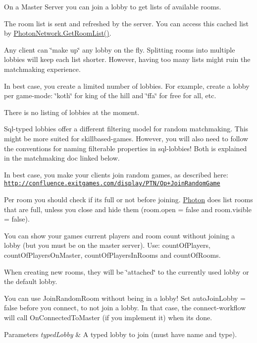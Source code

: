 On a Master Server you can join a lobby to get lists of available rooms. 

The room list is sent and refreshed by the server. You can access this cached list by \hyperlink{class_photon_network_aeef2085375accb7d4bc88e60cbe15eb9}{Photon\+Network.\+Get\+Room\+List()}.

Any client can \char`\"{}make up\char`\"{} any lobby on the fly. Splitting rooms into multiple lobbies will keep each list shorter. However, having too many lists might ruin the matchmaking experience.

In best case, you create a limited number of lobbies. For example, create a lobby per game-\/mode\+: \char`\"{}koth\char`\"{} for king of the hill and \char`\"{}ffa\char`\"{} for free for all, etc.

There is no listing of lobbies at the moment.

Sql-\/typed lobbies offer a different filtering model for random matchmaking. This might be more suited for skillbased-\/games. However, you will also need to follow the conventions for naming filterable properties in sql-\/lobbies! Both is explained in the matchmaking doc linked below.

In best case, you make your clients join random games, as described here\+: \href{http://confluence.exitgames.com/display/PTN/Op+JoinRandomGame}{\tt http\+://confluence.\+exitgames.\+com/display/\+P\+T\+N/\+Op+\+Join\+Random\+Game}

Per room you should check if it\textquotesingle{}s full or not before joining. \hyperlink{namespace_photon}{Photon} does list rooms that are full, unless you close and hide them (room.\+open = false and room.\+visible = false).

You can show your games current players and room count without joining a lobby (but you must be on the master server). Use\+: count\+Of\+Players, count\+Of\+Players\+On\+Master, count\+Of\+Players\+In\+Rooms and count\+Of\+Rooms.

When creating new rooms, they will be \char`\"{}attached\char`\"{} to the currently used lobby or the default lobby.

You can use Join\+Random\+Room without being in a lobby! Set auto\+Join\+Lobby = false before you connect, to not join a lobby. In that case, the connect-\/workflow will call On\+Connected\+To\+Master (if you implement it) when it\textquotesingle{}s done. 


\begin{DoxyParams}{Parameters}
{\em typed\+Lobby} & A typed lobby to join (must have name and type).\\
\hline
\end{DoxyParams}
